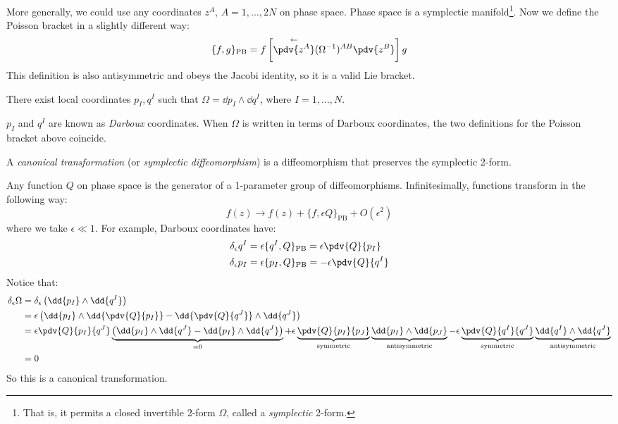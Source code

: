 \documentclass{jknotes}
\begin{document}
More generally, we could use any coordinates \(z^A\), \(A=1,\dots,2N\) on phase space. Phase space is a symplectic manifold\footnote{That is, it permits a closed invertible 2-form \(\Omega\), called a \emph{symplectic} 2-form.}. Now we define the Poisson bracket in a slightly different way:
\begin{equation}
    \{f,g\}_{\text{PB}} = f \left[ \overset{\leftarrow}{\pdv{z^A}}(\Omega^{-1})^{AB} \pdv{z^B} \right]g
\end{equation}
This definition is also antisymmetric and obeys the Jacobi identity, so it is a valid Lie bracket.
\begin{theorem}[Darboux]
    There exist local coordinates \(p_I,q^I\) such that \(\Omega=\dd{p_I}\wedge\dd{q^I}\), where \(I=1,\dots,N\).
\end{theorem}
\(p_I\) and \(q^I\) are known as \emph{Darboux} coordinates. When \(\Omega\) is written in terms of Darboux coordinates, the two definitions for the Poisson bracket above coincide.

\begin{defn}
    A \emph{canonical transformation} (or \emph{symplectic diffeomorphism}) is a diffeomorphism that preserves the symplectic 2-form.
\end{defn}

Any function \(Q\) on phase space is the generator of a 1-parameter group of diffeomorphisms. Infinitesimally, functions transform in the following way:
\begin{equation}
    f(z) \rightarrow f(z) + \{f,\epsilon Q\}_{\text{PB}} + O(\epsilon^2)
\end{equation}
where we take \(\epsilon \ll 1\). For example, Darboux coordinates have:
\begin{align}
    \delta_\epsilon q^I &= \epsilon \{q^I,Q\}_{\text{PB}} = \epsilon\pdv{Q}{p_I} \\
    \delta_\epsilon p_I &= \epsilon \{p_I,Q\}_{\text{PB}} = - \epsilon\pdv{Q}{q^I}
\end{align}
Notice that:
\begin{align}
    \delta_\epsilon \Omega &= \delta_\epsilon\left( \dd{p_I}\wedge\dd{q^I} \right)\\
    &= \epsilon \left( \dd{p_I}\wedge\dd{\pdv{Q}{p_I}} - \dd{\pdv{Q}{q^J}}\wedge\dd{q^J} \right)\\
    &= \epsilon \pdv{Q}{p_I}{q^J}\underbrace{\left( \dd{p_I}\wedge\dd{q^J} - \dd{p_I}\wedge\dd{q^J} \right)}_{=0}
    + \epsilon \underbrace{\pdv{Q}{p_I}{p_J}}_{\text{symmetric}} \underbrace{\dd{p_I}\wedge\dd{p_J}}_{\text{antisymmetric}}
    - \epsilon \underbrace{\pdv{Q}{q^I}{q^J}}_{\text{symmetric}} \underbrace{\dd{q^I}\wedge\dd{q^J}}_{\text{antisymmetric}} \\
    &= 0
\end{align}
So this is a canonical transformation.
\end{document}
